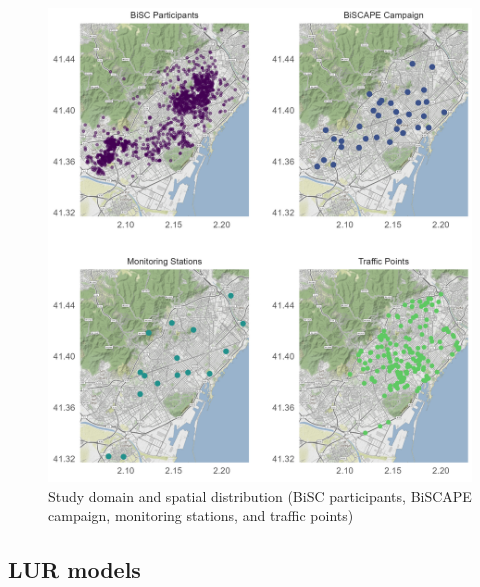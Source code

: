 \documentclass{article}
\begin{document}
\captionsetup[figure]{skip=-4pt}
\begin{figure}[!htb]
\includegraphics[width=1.0\textwidth]{figures/fig1_op2.png}
\caption{Study domain and spatial distribution (BiSC participants, BiSCAPE campaign, monitoring stations, and traffic points)}
\label{fig1}
\end{figure}



\subsection{LUR models}
\end{document}

